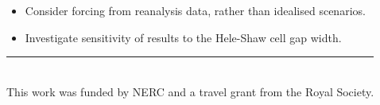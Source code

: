 \documentclass[landscape,24pt, a0paper,colspace=8mm,blockverticalspace=8mm]{tikzposter}
\begin{document}
\begin{columns}
\begin{subcolumns}
{}
 

 
{
\begin{itemize}
\item Consider forcing from reanalysis data, rather than idealised scenarios.
\item Investigate sensitivity of results to the Hele-Shaw cell gap width.
\end{itemize}
\vspace{5pt}
\rule{\linewidth}{.4pt}
\vspace{5pt} \\
This work was funded by NERC and a travel grant from the Royal Society.
{
\fontsize{16}{15}\selectfont 
\renewcommand\refname{\vskip -2.5cm}

\renewcommand*{\bibfont}{\scriptsize}
\printbibliography
}

}


%

 
\end{subcolumns}

\end{columns}
\end{document}
